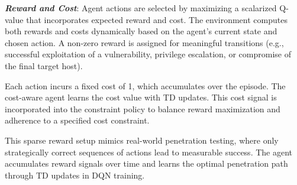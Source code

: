 \noindent \textit{\textbf{Reward and Cost}}:
Agent actions are selected by maximizing a scalarized Q-value that incorporates expected reward and cost. The environment computes both rewards and costs dynamically based on the agent's current state and chosen action. A non-zero reward is assigned for meaningful transitions (e.g., successful exploitation of a vulnerability, privilege escalation, or compromise of the final target host). 

Each action incurs a fixed cost of 1, which accumulates over the episode. The cost-aware agent learns the cost value with TD updates. This cost signal is incorporated into the constraint policy to balance reward maximization and adherence to a specified cost constraint.

This sparse reward setup mimics real-world penetration testing, where only strategically correct sequences of actions lead to measurable success. The agent accumulates reward signals over time and learns the optimal penetration path through TD updates in DQN training.


